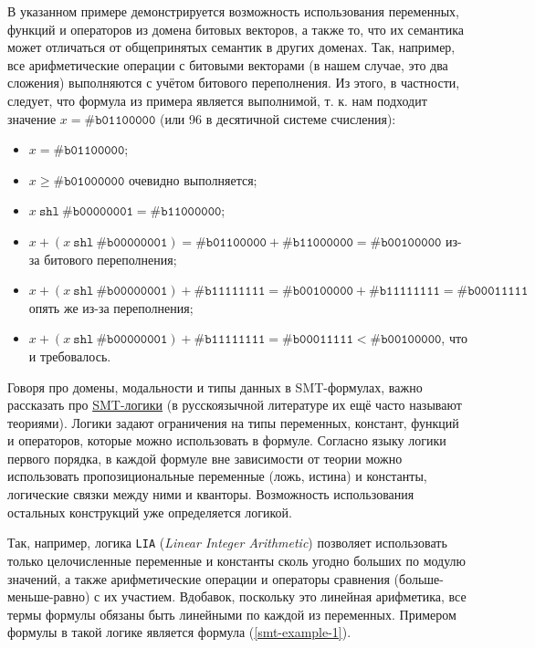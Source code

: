 В указанном примере демонстрируется возможность использования переменных, функций и операторов из домена битовых векторов, а также то, что их семантика может отличаться от общепринятых семантик в других доменах. Так, например, все арифметические операции с битовыми векторами (в нашем случае, это два сложения) выполняются с учётом битового переполнения. Из этого, в частности, следует, что формула из примера является выполнимой, т. к. нам подходит значение $x = \texttt{\#b01100000}$ (или 96 в десятичной системе счисления):
\begin{itemize}
    \item $x = \texttt{\#b01100000}$;
    \item $x \ge \texttt{\#b01000000}$ очевидно выполняется;
    \item $x \ \texttt{shl} \ \texttt{\#b00000001} = \texttt{\#b11000000}$;
    \item $x + (x \ \texttt{shl} \ \texttt{\#b00000001}) = \texttt{\#b01100000} + \texttt{\#b11000000} = \texttt{\#b00100000}$ из-за битового переполнения;
    \item $x + (x \ \texttt{shl} \ \texttt{\#b00000001}) + \texttt{\#b11111111} = \texttt{\#b00100000} + \texttt{\#b11111111} = \texttt{\#b00011111}$ опять же из-за переполнения;
    \item $x + (x \ \texttt{shl} \ \texttt{\#b00000001}) + \texttt{\#b11111111} = \texttt{\#b00011111} < \texttt{\#b00100000}$, что и требовалось.
\end{itemize}



Говоря про домены, модальности и типы данных в SMT-формулах, важно рассказать про \underline{SMT-логики} (в русскоязычной литературе их ещё часто называют теориями). Логики задают ограничения на типы переменных, констант, функций и операторов, которые можно использовать в формуле. Согласно языку логики первого порядка, в каждой формуле вне зависимости от теории можно использовать пропозициональные переменные (ложь, истина) и константы, логические связки между ними и кванторы. Возможность использования остальных конструкций уже определяется логикой.

Так, например, логика \texttt{LIA} (\textit{Linear Integer Arithmetic}) позволяет использовать только целочисленные переменные и константы сколь угодно больших по модулю значений, а также арифметические операции и операторы сравнения (больше-меньше-равно) с их участием. Вдобавок, поскольку это линейная арифметика, все термы формулы обязаны быть линейными по каждой из переменных. Примером формулы в такой логике является формула (\ref{smt-example-1}).

